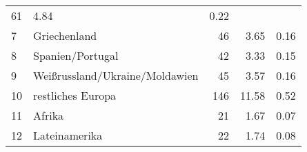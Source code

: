 \begin{longtable}{lXrrr}
       \num{61} &
       \num[round-mode=places,round-precision=2]{4.84} &
         \num[round-mode=places,round-precision=2]{0.22} \\

     7 &
     \multicolumn{1}{X}{ Griechenland   } &


       \num{46} &
       \num[round-mode=places,round-precision=2]{3.65} &
         \num[round-mode=places,round-precision=2]{0.16} \\

     8 &
     \multicolumn{1}{X}{ Spanien/Portugal   } &


       \num{42} &
       \num[round-mode=places,round-precision=2]{3.33} &
         \num[round-mode=places,round-precision=2]{0.15} \\

     9 &
     \multicolumn{1}{X}{ Weißrussland/Ukraine/Moldawien   } &


       \num{45} &
       \num[round-mode=places,round-precision=2]{3.57} &
         \num[round-mode=places,round-precision=2]{0.16} \\

     10 &
     \multicolumn{1}{X}{ restliches Europa   } &


       \num{146} &
       \num[round-mode=places,round-precision=2]{11.58} &
         \num[round-mode=places,round-precision=2]{0.52} \\

     11 &
     \multicolumn{1}{X}{ Afrika   } &


       \num{21} &
       \num[round-mode=places,round-precision=2]{1.67} &
         \num[round-mode=places,round-precision=2]{0.07} \\

     12 &
     \multicolumn{1}{X}{ Lateinamerika   } &


       \num{22} &
       \num[round-mode=places,round-precision=2]{1.74} &
         \num[round-mode=places,round-precision=2]{0.08} \\


\end{longtable}
